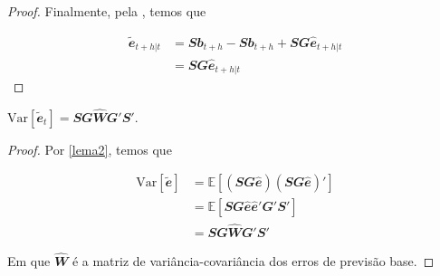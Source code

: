 \begin{apendicesenv}
\begin{proof}
  Finalmente, pela , temos que

  \begin{align}
    \mathbfit{\tilde{e}}_{t+h|t} &=  \mathbfit{Sb}_{t+h} - \mathbfit{Sb}_{t+h}  + \mathbfit{SG\hat{e}}_{t+h|t}  \\
    &= \mathbfit{SG\hat{e}}_{t+h|t}
  \end{align}
\end{proof}

\begin{theorem}
  \label{teorema1}

  $\text{Var}[\mathbfit{\tilde{e}}_t] = \mathbfit{SG\hat{W}G'S'}$.

\end{theorem}

\begin{proof}
  Por \ref{lema2}, temos que

  \begin{align}
    \text{Var}[\mathbfit{\tilde{e}}] &= \mathbb{E}[\mathbfit{(SG\hat{e})(SG\hat {e})'}] \\
    &= \mathbb{E}[\mathbfit{SG\hat{e}\hat{e}'G'S'}] \\
    &= \mathbfit{SG\hat{W}G'S'}
  \end{align}

  Em que $\mathbfit{\hat{W}}$ é a matriz de variância-covariância dos erros de  previsão base.
\end{proof}

\end{apendicesenv}

